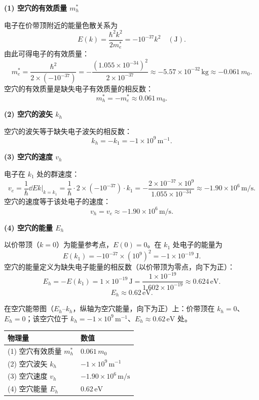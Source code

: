 \begin{derivationbox}[标准解题过程]
\textbf{(1) 空穴的有效质量 $m_h^*$}

电子在价带顶附近的能量色散关系为
\[
E(k)=\frac{\hbar^2k^2}{2m_e^*}=-10^{-37}k^2\quad(\text{J}).
\]
由此可得电子的有效质量：
\[
m_e^*=\frac{\hbar^2}{2\times(-10^{-37})}=-\frac{(1.055\times10^{-34})^2}{2\times10^{-37}}\approx-5.57\times10^{-32}\,\text{kg}\approx-0.061\,m_0.
\]
空穴的有效质量是缺失电子有效质量的相反数：
\begin{equation}
\boxed{m_h^*=-m_e^*\approx0.061\,m_0.}
\end{equation}

\textbf{(2) 空穴的波矢 $k_h$}

空穴的波矢等于缺失电子波矢的相反数：
\begin{equation}
\boxed{k_h=-k_1=-1\times10^9\,\text{m}^{-1}.}
\end{equation}

\textbf{(3) 空穴的速度 $v_h$}

电子在 $k_1$ 处的群速度：
\[
v_e=\frac{1}{\hbar}\dd{E}{k}\bigg|_{k=k_1}=\frac{1}{\hbar}\cdot2\times(-10^{-37})\cdot k_1=-\frac{2\times10^{-37}\times10^9}{1.055\times10^{-34}}\approx-1.90\times10^6\,\text{m/s}.
\]
空穴的速度等于该处电子的速度：
\begin{equation}
\boxed{v_h=v_e\approx-1.90\times10^6\,\text{m/s}.}
\end{equation}

\textbf{(4) 空穴的能量 $E_h$}

以价带顶（$k=0$）为能量参考点，$E(0)=0$。在 $k_1$ 处电子的能量为
\[
E(k_1)=-10^{-37}\times(10^9)^2=-1\times10^{-19}\,\text{J}.
\]
空穴的能量定义为缺失电子能量的相反数（以价带顶为零点，向下为正）：
\[
E_h=-E(k_1)=1\times10^{-19}\,\text{J}=\frac{1\times10^{-19}}{1.602\times10^{-19}}\approx0.624\,\text{eV}.
\]
\begin{equation}
\boxed{E_h\approx0.62\,\text{eV}.}
\end{equation}

在空穴能带图（$E_h$--$k_h$，纵轴为空穴能量，向下为正）上：价带顶在 $k_h=0$、$E_h=0$；该空穴位于 $k_h=-1\times10^9\,\text{m}^{-1}$、$E_h\approx0.62\,\text{eV}$ 处。
\end{derivationbox}

\begin{formulabox}[答案汇总]
\begin{center}
\begin{tabular}{ll}
\toprule
\textbf{物理量} & \textbf{数值} \\
\midrule
(1) 空穴有效质量 $m_h^*$ & $0.061\,m_0$ \\
(2) 空穴波矢 $k_h$ & $-1\times10^9\,\text{m}^{-1}$ \\
(3) 空穴速度 $v_h$ & $-1.90\times10^6\,\text{m/s}$ \\
(4) 空穴能量 $E_h$ & $0.62\,\text{eV}$ \\
\bottomrule
\end{tabular}
\end{center}
\end{formulabox}

